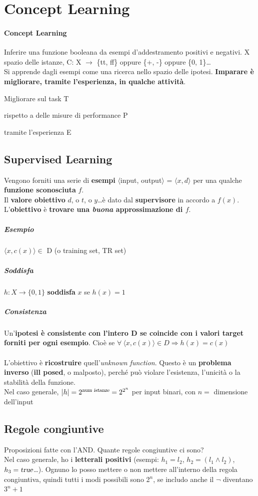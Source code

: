 \documentclass[10pt]{book}
\begin{document}
\section{Concept Learning}
\paragraph{Concept Learning} Inferire una funzione booleana da esempi d'addestramento positivi e negativi. X spazio delle istanze, C: X $\rightarrow$ \{tt, ff\} oppure \{+, -\} oppure \{0, 1\}\ldots\\
Si apprende dagli esempi come una ricerca nello spazio delle ipotesi. \textbf{Imparare è migliorare, tramite l'esperienza, in qualche attività}.
\begin{list}{}{}
	\item Migliorare sul task T
	\item rispetto a delle misure di performance P
	\item tramite l'esperienza E
\end{list}
\subsection{Supervised Learning}
Vengono forniti una serie di \textbf{esempi} $\langle$input, output$\rangle$ = $\langle x, d\rangle$ per una qualche \textbf{funzione sconosciuta} $f$.\\
Il \textbf{valore obiettivo} $d$, o $t$, o $y$\ldots è dato dal \textbf{supervisore} in accordo a $f(x)$. L'\textbf{obiettivo} è \textbf{trovare una \textit{buona} approssimazione di $f$}.
\subparagraph{Esempio} $\langle x, c(x)\rangle \in$ D (o training set, TR set)
\subparagraph{Soddisfa} $h : X \rightarrow \{0, 1\}$ \textbf{soddisfa} $x$ se $h(x) = 1$
\subparagraph{Consistenza} Un'\textbf{ipotesi è consistente con l'intero D se coincide con i valori target forniti per ogni esempio}. Cioè se $\forall\:\langle x, c(x)\rangle\in D \Rightarrow h(x) = c(x)$
\paragraph{} L'obiettivo è \textbf{ricostruire} quell'\textit{unknown function}. Questo è un \textbf{problema inverso} (\textbf{ill posed}, o malposto), perché può violare l'esistenza, l'unicità o la stabilità della funzione.\\
Nel caso generale, $|h| = 2^{\textsl{num istanze}} = 2^{2^n}$ per input binari, con $n =$ dimensione dell'input
\subsection{Regole congiuntive}
Proposizioni fatte con l'AND. Quante regole congiuntive ci sono?\\
Nel caso generale, ho i \textbf{letterali positivi} (esempi: $h_1 = l_2$, $h_2 = (l_1 \wedge l_2)$, $h_3 = \textsl{true}$\ldots).
Ognuno lo posso mettere o non mettere all'interno della regola congiuntiva, quindi tutti i modi possibili sono 2$^n$, se includo anche il $\neg$ diventano $3^n + 1$
\pagebreak
\end{document}
